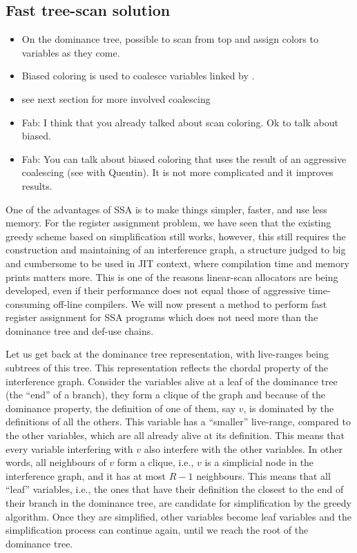 {\subsection{Fast tree-scan solution}
{\sl
\begin{itemize}
  \item On the dominance tree, possible to scan from top and assign colors to 
    variables as they come.
  \item Biased coloring is used to coalesce variables linked by \phifuns.
  \item see next section for more involved coalescing
  \item Fab: I think that you already talked about scan coloring. Ok to talk about biased.
  \item Fab: You can talk about biased coloring that uses the result of an aggressive coalescing (see with Quentin). It is not more complicated and it improves results.
\end{itemize}
}

One of the advantages of SSA is to make things simpler, faster, and use less 
memory. For the register assignment problem, we have seen that the existing 
greedy scheme based on simplification still works, however, this still requires 
the construction and maintaining of an interference graph, a structure judged 
to big and cumbersome to be used in JIT context, where compilation time and 
memory prints matters more. This is one of the reasons linear-scan allocators 
are being developed, even if their performance does not equal those of 
aggressive time-consuming off-line compilers. We will now present a method to 
perform fast register assignment for SSA programs which does not need more than 
the dominance tree and def-use chains.

Let us get back at the dominance tree representation, with live-ranges being 
subtrees of this tree. This representation reflects the chordal property of the 
interference graph. Consider the variables alive at a leaf of the dominance 
tree (the ``end'' of a branch), they form a clique of the graph and because of 
the dominance property, the definition of one of them, say $v$, is dominated by 
the definitions of all the others.  This variable has a ``smaller'' live-range, 
compared to the other variables, which are all already alive at its definition.  
This means that every variable interfering with $v$ also interfere with the 
other variables. In other words, all neighbours of $v$ form a clique, i.e., $v$ 
is a simplicial node in the interference graph, and it has at most $R-1$ 
neighbours.  This means that all ``leaf'' variables, i.e., the ones that have 
their definition the closest to the end of their branch in the dominance tree, 
are candidate for simplification by the greedy algorithm. Once they are 
simplified, other variables become leaf variables and the simplification 
process can continue again, until we reach the root of the dominance tree.

}
